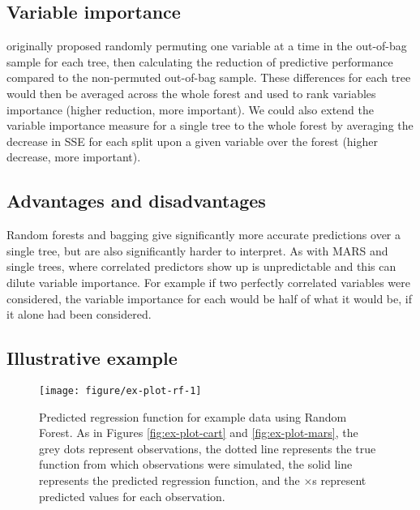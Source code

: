 \documentclass[12pt]{article}
\begin{document}
\subsection{Variable importance} %
\label{sub:variable_importance_rf}

\textcite{rf} originally proposed randomly permuting one variable at a time in the out-of-bag sample for each tree, then calculating the reduction of predictive performance compared to the non-permuted out-of-bag sample. These differences for each tree would then be averaged across the whole forest and used to rank variables importance (higher reduction, more important). We could also extend the variable importance measure for a single tree to the whole forest by averaging the decrease in SSE for each split upon a given variable over the forest (higher decrease, more important).


\subsection{Advantages and disadvantages} %
\label{sub:advantages_and_disadvantages_rf}

Random forests and bagging give significantly more accurate predictions over a single tree, but are also significantly harder to interpret. As with MARS and single trees, where correlated predictors show up is unpredictable and this can dilute variable importance. For example if two perfectly correlated variables were considered, the variable importance for each would be half of what it would be, if it alone had been considered.


\subsection{Illustrative example} %
\label{sub:example_rf}

\begin{figure}[!htb]
\centering
  \texttt{[image: figure/ex-plot-rf-1]}

\caption[Predicted regression function for example data using Random Forest]{Predicted regression function for example data using Random Forest. As in Figures \ref{fig:ex-plot-cart} and \ref{fig:ex-plot-mars}, the grey dots represent observations, the dotted line represents the true function from which observations were simulated, the solid line represents the predicted regression function, and the $\times$s represent predicted values for each observation.}\label{fig:ex-plot-rf}
\end{figure}
\end{document}

